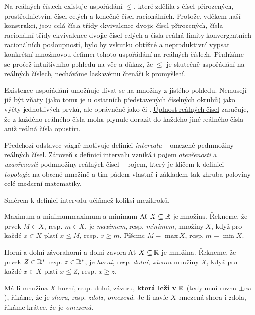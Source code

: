 Na reálných číslech existuje uspořádání $ \leq $, které zdělila z čísel
přirozených, prostřednictvím čísel celých a konečně čísel racionálních. Protože,
vděkem naší konstrukci, jsou celá čísla třídy ekvivalence dvojic čísel
přirozených, čísla racionální třídy ekvivalence dvojic čísel celých a čísla
reálná limity konvergentních racionálních posloupností, bylo by vskutku obtížné
a neproduktivní vypsat konkrétní množinovou definici tohoto uspořádání na
reálných číslech. Přidržíme se pročež intuitivního pohledu na věc a důkaz, že
$ \leq $ je skutečně uspořádání na reálných číslech, necháváme laskavému čtenáři
k promyšlení.

Existence uspořádání umožňuje dívat se na množiny z jistého 
pohledu. Nemusejí již být vňaty (jako tomu je u ostatních představených
číselných okruhů) jako výčty jednotlivých prvků, ale oprávněně jako
 či . \hyperref[cor:r-jsou-uplna]{Úplnost reálných
čísel} zaručuje, že z každého reálného čísla mohu plynule dorazit do každého
jiné reálného čísla aniž reálná čísla opustím.

Předchozí odstavec vágně motivuje definici \emph{intervalu} -- 
omezené podmnožiny reálných čísel. Zároveň s definicí intervalu vzniká i pojem
\emph{otevřenosti} a \emph{uzavřenosti} podmnožiny reálných čísel -- pojem,
který je klíčem k definici \emph{topologie} na obecné množině a tím pádem
vlastně i základem tak zhruba poloviny celé moderní matematiky.

Směrem k definici intervalu učiňmež koliksi mezikroků.

\begin{definition}{Maximum a minimum}{maximum-a-minimum}
 Ať $X \subseteq \mathbb{R}$ je množina. Řekneme, že prvek $M \in X$, resp. $m \in X$,
 je \emph{maximem}, resp. \emph{minimem}, množiny $X$, když pro každé $x \in X$
 platí $x \leq M$, resp. $x \geq m$. Píšeme $M = \max X$, resp. $m = \min X$.
\end{definition}

\begin{definition}{Horní a dolní závora}{horni-a-dolni-zavora}
 Ať $X \subseteq \mathbb{R}$ je množina. Řekneme, že prvek $Z \in \mathbb{R}^{*}$ resp. $z \in
 \mathbb{R}^{*}$, je \emph{horní}, resp. \emph{dolní}, \emph{závora} množiny $X$, když
 pro každé $x \in X$ platí $x \leq Z$, resp. $x \geq z$.

 Má-li množina $X$ horní, resp. dolní, závoru, \textbf{která leží v $\mathbb{R}$} (tedy
 není rovna $ \pm \infty$), říkáme, že je \emph{shora}, resp. \emph{zdola},
 \emph{omezená}. Je-li navíc $X$ omezená shora i zdola, říkáme krátce, že je
 \emph{omezená}.
\end{definition}

